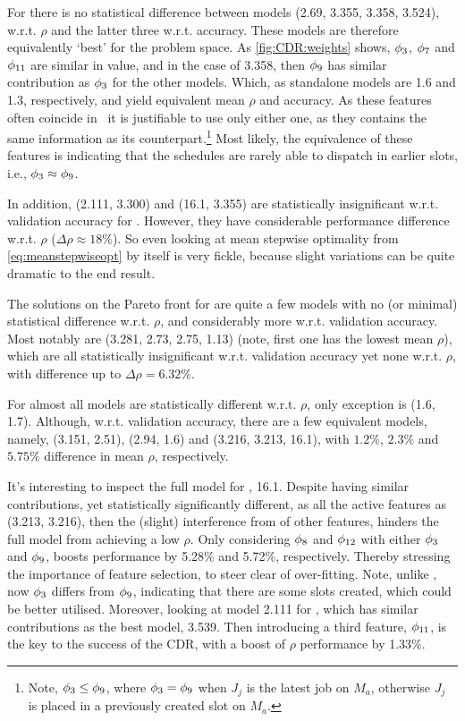For   there is no statistical difference between models (2.69, 
3.355, 3.358, 3.524), w.r.t. $\rho$ and the latter three w.r.t. 
accuracy. These models are therefore equivalently `best' for the problem space.
As \cref{fig:CDR:weights} shows, $\phi_3$, $\phi_7$ and $\phi_{11}$ 
are similar in value, and in the case of 3.358, then $\phi_{9}$ has similar 
contribution as $\phi_3$ for the other models. 
Which, as standalone models are 1.6 and 1.3, respectively, and yield 
equivalent mean $\rho$ and accuracy.
As these features often coincide in \jsp\, it is justifiable to use only 
either one, as they contains the same information as its 
counterpart.\footnote{Note, $\phi_3\leq\phi_{9}$, where
  $\phi_3=\phi_{9}$ when $J_j$ is the latest job on $M_a$, 
  otherwise $J_j$ is placed in a previously created slot on $M_a$.}
Most likely, the equivalence of these features is indicating that the 
schedules are rarely able to dispatch in earlier slots, i.e., 
$\phi_3\approx\phi_{9}$. 

In addition, (2.111, 3.300) and (16.1, 3.355) are statistically insignificant 
w.r.t. validation accuracy for . However, they have considerable 
performance difference w.r.t. $\rho$ ($\Delta\rho \approx 18\%$). 
So even looking at mean stepwise optimality from \cref{eq:meanstepwiseopt} by 
itself is very fickle, because slight variations can be quite dramatic to the 
end result. 

The solutions on the Pareto front for  are quite a few models
with no (or minimal) statistical difference w.r.t. $\rho$, and 
considerably more w.r.t. validation accuracy. 
Most notably are (3.281, 2.73, 2.75, 1.13)
(note, first one has the lowest mean $\rho$), which are all statistically 
insignificant w.r.t. validation accuracy yet none w.r.t. $\rho$, with 
difference up to $\Delta\rho=6.32\%$.

For  almost all models are statistically different w.r.t. $\rho$, 
only exception is (1.6, 1.7).
Although, w.r.t. validation accuracy, there are a few equivalent models, 
namely, (3.151, 2.51), (2.94, 1.6) and (3.216, 3.213, 16.1), with $1.2\%$, 
$2.3\%$ and $5.75\%$ difference in mean $\rho$, respectively. 

It's interesting to inspect the full model for , 16.1. 
Despite having similar contributions, yet statistically significantly 
different, as all the active features as (3.213, 3.216), then the (slight) 
interference from of other features, hinders the full model from achieving a 
low $\rho$. 
Only considering $\phi_8$ and $\phi_{12}$ with either $\phi_3$ and 
$\phi_{9}$, boosts performance by 5.28\% and 5.72\%, respectively. 
Thereby stressing the importance of feature selection, to steer clear of 
over-fitting. Note, unlike , now $\phi_3$ differs from 
$\phi_{9}$, indicating that there are some slots created, which could be 
better utilised.
Moreover, looking at model 2.111 for , which has similar 
contributions as the best model, 3.539. Then introducing a third feature, 
$\phi_{11}$, is the key to the success of the CDR, with a boost of $\rho$ 
performance by 1.33\%. 

